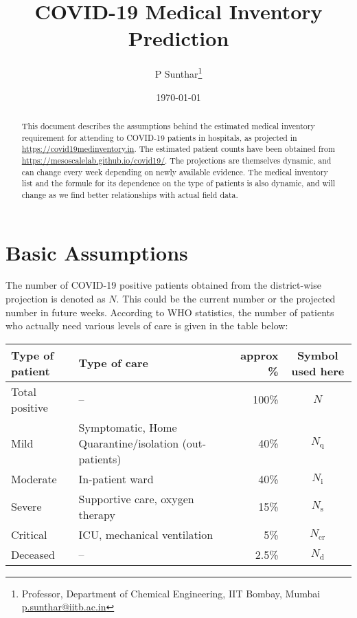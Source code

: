 \documentclass{article}
\newcommand{\email}[1]{\href{mailto:#1}{#1}}
\newcommand{\nd}{\ensuremath{N_{\mathrm{d}}}}
\newcommand{\ncr}{\ensuremath{N_{\mathrm{cr}}}}
\newcommand{\ns}{\ensuremath{N_{\mathrm{s}}}}
\newcommand{\nin}{\ensuremath{N_{\mathrm{i}}}}
\newcommand{\nq}{\ensuremath{N_{\mathrm{q}}}}
\begin{document}
\title{COVID-19 Medical Inventory Prediction}
\date{\today}
\author{
  P Sunthar\thanks{Professor, Department of Chemical Engineering, IIT
    Bombay, Mumbai \email{p.sunthar@iitb.ac.in}}
}
\maketitle
\begin{abstract}
  This document describes the assumptions behind the estimated medical
  inventory requirement for attending to COVID-19 patients in
  hospitals, as projected in \url{https://covid19medinventory.in}. The
  estimated patient counts have been obtained from
  \url{https://mesoscalelab.github.io/covid19/}. The projections are
  themselves dynamic, and can change every week depending on newly
  available evidence. The medical inventory list and the formule for
  its dependence on the type of patients is also dynamic, and will
  change as we find better relationships with actual field data.
\end{abstract}

\section{Basic Assumptions}

The number of COVID-19 positive patients obtained from the
district-wise projection\cite{ansualok20} is denoted as $N$. This could
be the current number or the projected number in future weeks.
According to WHO statistics\cite{who19mar}, the number of patients who
actually need various levels of care \cite{aiims2020a} is given in the
table below:

\noindent
\begin{tabularx}{\linewidth}{XXrc}
  \toprule
  Type of patient & Type of care & approx \% & Symbol used here \\
  \midrule
  Total positive & -- & 100\% & $N$ \\
  Mild & Symptomatic, Home Quarantine/isolation (out-patients) & 40\% & \nq \\
  Moderate & In-patient ward & 40\% & \nin \\
  Severe & Supportive care, oxygen therapy   & 15\% & \ns \\
  Critical & ICU, mechanical ventilation & 5\% & \ncr \\
  Deceased & --  & 2.5\% & \nd \\
\bottomrule  
\end{tabularx}
\end{document}
